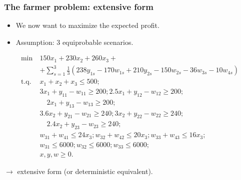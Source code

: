 \documentclass{beamer}
\def\blue{\color{blue}}
\def\red{\color{red}}
\begin{document}
\begin{frame}
\frametitle{The farmer problem: extensive form}

\begin{itemize}
	\item 
We now want to maximize the {\red expected profit}.
\item
Assumption: 3 equiprobable scenarios.
\end{itemize}
\begin{small}
\begin{align*}
\min\ & 150x_1 + 230x_2 + 260x_3 +\\
&  + \sum_{s = 1}^3 \frac{1}{3}(238y_{1s} - 170w_{1s} + 210y_{2s} - 150w_{2s} -
36w_{3s} - 10w_{4s}) \\
\text{t.q. } & x_1 + x_2 + x_3 \leq 500; \\
& 3x_1 + y_{11} - w_{11} \geq 200; 2.5x_1 + y_{12} - w_{12} \geq 200; \\
& \quad{}  2x_1 + y_{13} - w_{13} \geq 200; \\
& 3.6x_2 + y_{21} - w_{21} \geq 240; 3x_2 + y_{22} - w_{22} \geq
240;\\
& \quad{} 2.4x_2 + y_{23} - w_{23} \geq 240; \\
& w_{31} + w_{41} \leq 24 x_3; w_{32} + w_{42} \leq 20 x_3; w_{33} +
w_{43} \leq 16 x_3; \\
& w_{31} \leq 6000; w_{32} \leq 6000; w_{33} \leq 6000; \\
& x, y, w \geq 0.
\end{align*}
\end{small}
$\rightarrow$ {\blue extensive form} (or {\blue deterministic equivalent}).

\end{frame}
\end{document}
